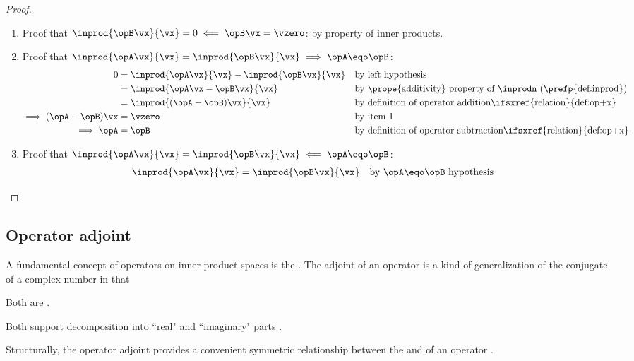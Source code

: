 \begin{proof}
\begin{enumerate}
\item Proof that $\inprod{\opB\vx}{\vx}=0\impliedby\opB\vx=\vzero$: by property of inner products.

\item Proof that $\inprod{\opA\vx}{\vx}=\inprod{\opB\vx}{\vx}\implies\opA\eqo\opB$:
  \begin{align*}
    0
      &= \inprod{\opA\vx}{\vx}-\inprod{\opB\vx}{\vx}
      && \text{by left hypothesis}
    \\&= \inprod{\opA\vx-\opB\vx}{\vx}
      && \text{by \prope{additivity} property of $\inprodn$ (\prefp{def:inprod})}
    \\&= \inprod{(\opA-\opB)\vx}{\vx}
      && \text{by definition of operator addition\ifsxref{relation}{def:op+x}}
    \\\implies (\opA-\opB)\vx&=\vzero
      && \text{by item 1}
    \\\implies \opA &= \opB
      && \text{by definition of operator subtraction\ifsxref{relation}{def:op+x}}
  \end{align*}

\item Proof that $\inprod{\opA\vx}{\vx}=\inprod{\opB\vx}{\vx}\impliedby\opA\eqo\opB$:
  \begin{align*}
    \inprod{\opA\vx}{\vx}
      &= \inprod{\opB\vx}{\vx}
      && \text{by $\opA\eqo\opB$ hypothesis}
  \end{align*}
\end{enumerate}
\end{proof}

\subsection{Operator adjoint}
A fundamental concept of operators on inner product spaces is the
 .
The adjoint of an operator is a kind of generalization of the conjugate
of a complex number in that
\begin{liste}
  \item Both are  .
  \item Both support decomposition into ``real" and ``imaginary" parts .
\end{liste}
Structurally, the operator adjoint provides a convenient symmetric relationship
between the  and  of an operator .

